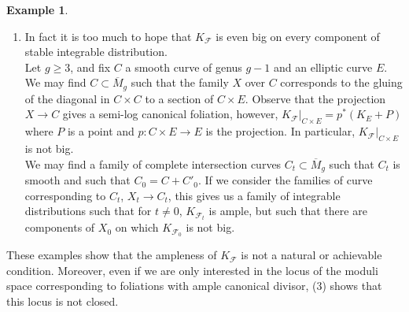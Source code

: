\documentclass[12pt, a4paper]{amsart}
\theoremstyle{definition}
\newtheorem{ej}[theorem]{Example}
\theoremstyle{named}
\begin{document}
\begin{ej}
\begin{enumerate}
\item     In fact it is too much to hope that $K_{\mathcal F}$ is even big on every component of stable integrable distribution.
\\
Let $g \ge 3$, and fix $C$ a smooth curve of genus $g-1$ and an elliptic curve $E$.  We may find $C \subset \overline{M}_g$ such that the family $X$ over $C$ corresponds to the gluing of the diagonal in $C\times C$ to a section of $C \times E$.  Observe that the projection
$X \to C$ gives a semi-log canonical foliation, however, $K_{\mathcal F}\vert_{C \times E} = p^*(K_{E}+P)$ where $P$ is a point and $p\colon C \times E \to E$ is the projection.  In particular, $K_{\mathcal F}\vert_{C\times E}$ is not big.
\\
We may find a family of complete intersection curves $C_t \subset \overline{M}_g$ such that $C_t$ is smooth and such that $C_0 = C+C'_0$.  
If we consider the families of curve corresponding to $C_t$, $X_t \to C_t$, 
this gives us a family of integrable distributions such that for $t \neq 0$, 
$K_{\mathcal F_t}$ is ample, but such that there are components of $X_0$ on which $K_{\mathcal F_0}$ is not big.
\end{enumerate}
These examples show that the ampleness of $K_{\mathcal F}$ is not a natural or achievable condition. Moreover, even if we are only interested in the locus of the moduli space corresponding to foliations with ample canonical divisor, (3) shows that this locus is not closed.
\end{ej}
\end{document}
